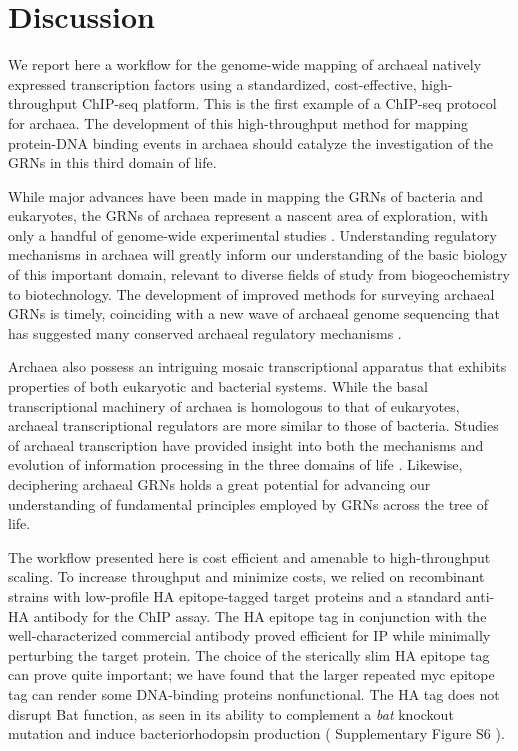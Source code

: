 \section{Discussion}

We report here a workflow for the genome-wide mapping of archaeal natively expressed transcription factors using a standardized, cost-effective, high-throughput ChIP-seq platform. This is the first example of a ChIP-seq protocol for archaea. The development of this high-throughput method for mapping protein-DNA binding events in archaea should catalyze the investigation of the GRNs in this third domain of life.

While major advances have been made in mapping the GRNs of bacteria and eukaryotes, the GRNs of archaea represent a nascent area of exploration, with only a handful of genome-wide experimental studies \cite{bonneau_predictive_2007,facciotti_general_2007,kaur_coordination_2010,schmid2011two,yoon2011parallel}. Understanding regulatory mechanisms in archaea will greatly inform our understanding of the basic biology of this important domain, relevant to diverse fields of study from biogeochemistry to biotechnology. The development of improved methods for surveying archaeal GRNs is timely, coinciding with a new wave of archaeal genome sequencing that has suggested many conserved archaeal regulatory mechanisms \cite{yoon2011parallel,gelfand_prediction_2000}.

Archaea also possess an intriguing mosaic transcriptional apparatus that exhibits properties of both eukaryotic and bacterial systems. While the basal transcriptional machinery of archaea is homologous to that of eukaryotes, archaeal transcriptional regulators are more similar to those of bacteria. Studies of archaeal transcription have provided insight into both the mechanisms and evolution of information processing in the three domains of life \cite{bell_transcription_1998,geiduschek_archaeal_2005}. Likewise, deciphering archaeal GRNs holds a great potential for advancing our understanding of fundamental principles employed by GRNs across the tree of life.

The workflow presented here is cost efficient and amenable to high-throughput scaling. To increase throughput and minimize costs, we relied on recombinant strains with low-profile HA epitope-tagged target proteins and a standard anti-HA antibody for the ChIP assay. The HA epitope tag in conjunction with the well-characterized commercial antibody proved efficient for IP while minimally perturbing the target protein. The choice of the sterically slim HA epitope tag can prove quite important; we have found that the larger repeated myc epitope tag \cite{ren2000genome} can render some DNA-binding proteins nonfunctional. The HA tag does not disrupt Bat function, as seen in its ability to complement a {\em bat} knockout mutation and induce bacteriorhodopsin production ( Supplementary Figure S6 ).

